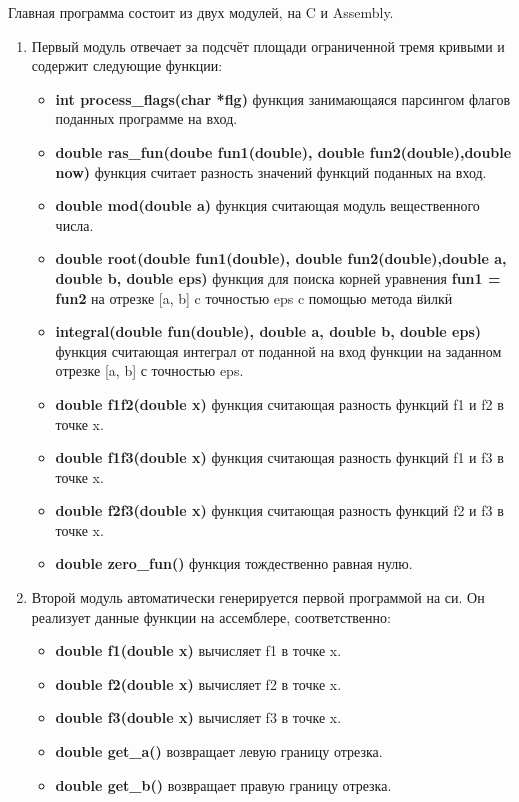 \documentclass[a4paper,12pt,titlepage,finall]{article}
\begin{document}
Главная программа состоит из двух модулей, на C и Assembly.
\begin{enumerate}
  \item Первый модуль отвечает за подсчёт площади ограниченной тремя кривыми и содержит следующие функции:
  \begin{itemize}
    \item {\bf \ttfamily int process\_flags(char *flg)} функция занимающаяся парсингом флагов поданных программе на вход.
    \item {\bf \ttfamily double ras\_fun(doube fun1(double), double fun2(double),\newline double now)} функция считает разность значений функций поданных на вход.
    \item {\bf \ttfamily double mod(double a)} функция считающая модуль вещественного числа.
    \item {\bf \ttfamily double root(double fun1(double), double fun2(double),\newline double a, double b, double eps)} функция для поиска корней уравнения {\bf \ttfamily fun1 = fun2} на отрезке [a, b] c точностью eps c помощью метода \"вилки\"
    \item {\bf \ttfamily integral(double fun(double), double a, double b, double eps)} функция считающая интеграл от поданной на вход функции на заданном отрезке [a, b] с точностью eps.
    \item {\bf \ttfamily double f1f2(double x)} функция считающая разность функций f1 и f2 в точке x.
    \item {\bf \ttfamily double f1f3(double x)} функция считающая разность функций f1 и f3 в точке x.
    \item {\bf \ttfamily double f2f3(double x)} функция считающая разность функций f2 и f3 в точке x.
    \item {\bf \ttfamily double zero\_fun()} функция тождественно равная нулю.
  \end{itemize}
  
  \item Второй модуль автоматически генерируется первой программой на си. Он реализует данные функции на ассемблере, соответственно:
  \begin{itemize}
    \item {\bf \ttfamily double f1(double x)} вычисляет f1 в точке x.
    \item {\bf \ttfamily double f2(double x)} вычисляет f2 в точке x.
    \item {\bf \ttfamily double f3(double x)} вычисляет f3 в точке x.
    \item {\bf \ttfamily double get\_a()} возвращает левую границу отрезка.
    \item {\bf \ttfamily double get\_b()} возвращает правую границу отрезка.
  \end{itemize}
\end{enumerate}
\end{document}
